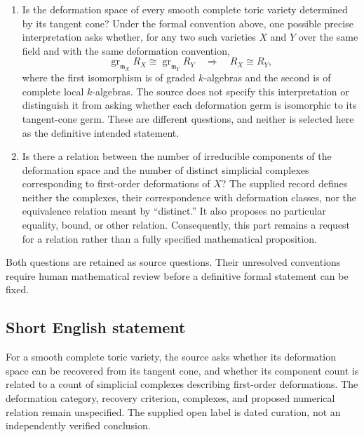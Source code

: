 \documentclass[11pt]{article}
\begin{document}
\begin{enumerate}
\item Is the deformation space of every smooth complete toric variety determined by its tangent cone? Under the formal convention above, one possible precise interpretation asks whether, for any two such varieties \(X\) and \(Y\) over the same field and with the same deformation convention,
\[
\operatorname{gr}_{\mathfrak m_X}R_X\cong
\operatorname{gr}_{\mathfrak m_Y}R_Y
\quad\Longrightarrow\quad
R_X\cong R_Y,
\]
where the first isomorphism is of graded \(k\)-algebras and the second is of complete local \(k\)-algebras. The source does not specify this interpretation or distinguish it from asking whether each deformation germ is isomorphic to its tangent-cone germ. These are different questions, and neither is selected here as the definitive intended statement.
\item Is there a relation between the number of irreducible components of the deformation space and the number of distinct simplicial complexes corresponding to first-order deformations of \(X\)? The supplied record defines neither the complexes, their correspondence with deformation classes, nor the equivalence relation meant by ``distinct.'' It also proposes no particular equality, bound, or other relation. Consequently, this part remains a request for a relation rather than a fully specified mathematical proposition.
\end{enumerate}

Both questions are retained as source questions. Their unresolved conventions require human mathematical review before a definitive formal statement can be fixed.
\subsection{Short English statement}
For a smooth complete toric variety, the source asks whether its deformation space can be recovered from its tangent cone, and whether its component count is related to a count of simplicial complexes describing first-order deformations. The deformation category, recovery criterion, complexes, and proposed numerical relation remain unspecified. The supplied open label is dated curation, not an independently verified conclusion.
\end{document}

